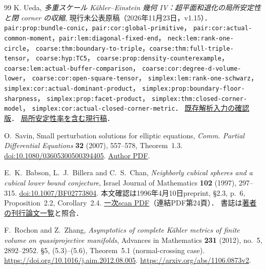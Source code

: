 \begin{thebibliography}{99}
K. Ueda,
\emph{多重スケール Kähler--Einstein 幾何 IV：超平面和退化の局所安定性と閉 corner の収縮},
現行未公表原稿（2026年11月23日，v1.15）．
\texttt{pair:prop:bundle-conic}，\texttt{pair:cor:global-primitive}，
\texttt{pair:cor:actual-common-moment}，\texttt{pair:lem:diagonal-fixed-end}，
\texttt{neck:lem:rank-one-circle}，
\texttt{coarse:thm:boundary-to-triple}，\texttt{coarse:thm:full-triple-tensor}，
\texttt{coarse:hyp:TC5}，
\texttt{coarse:prop:density-counterexample}，
\texttt{coarse:lem:actual-buffer-comparison}，
\texttt{coarse:cor:degree-d-volume-lower}，
\texttt{coarse:cor:open-square-tensor}，
\texttt{simplex:lem:rank-one-schwarz}，
\texttt{simplex:cor:actual-dominant-product}，
\texttt{simplex:prop:boundary-floor-sharpness}，
\texttt{simplex:prop:facet-product}，
\texttt{simplex:thm:closed-corner-model}，
\texttt{simplex:cor:actual-closed-corner-metric}．
\href{https://github.com/uedakazushi/kaehler-einstein-degeneration/blob/9220d4879a7da6c5fab493cf122b1b30829995a5/papers/kaehler-einstein-degeneration.tex}{既存解析入力の確認版}．
\href{https://github.com/uedakazushi/kaehler-einstein-degeneration/blob/1ee0acaf876b1334c964d60c409feb3b18b62373/papers/kaehler-einstein-degeneration.tex}{局所安定性率を含む現行稿}．

O.~Savin,
Small perturbation solutions for elliptic equations,
\emph{Comm. Partial Differential Equations} \textbf{32} (2007), 557--578,
Theorem~1.3.
\href{https://doi.org/10.1080/03605300500394405}{doi:10.1080/03605300500394405}.
\href{https://www.math.columbia.edu/~savin/Small_pert.pdf}{Author PDF}.

E.~K.~Babson, L.~J.~Billera and C.~S.~Chan,
\emph{Neighborly cubical spheres and a cubical lower bound conjecture},
Israel Journal of Mathematics \textbf{102} (1997), 297--315.
\href{https://doi.org/10.1007/BF02773804}{doi:10.1007/BF02773804}.
本文確認は1996年4月10日preprint, \S2.3, p.~6,
Proposition~2.2, Corollary~2.4.
\href{https://www.math.ucdavis.edu/~deloera/MISC/LA-BIBLIO/trunk/Billera/BilleraEhrenborgcdindex.pdf}{一次scan PDF}（連結PDF第24頁）．
書誌は\href{https://pi.math.cornell.edu/~billera/research.html}{著者の刊行論文一覧}と照合．

F.~Rochon and Z.~Zhang,
\emph{Asymptotics of complete K\"ahler metrics of finite volume on quasiprojective manifolds},
Advances in Mathematics \textbf{231} (2012), no.~5, 2892--2952.
\S5, (5.3)--(5.6), Theorem~5.1 (normal-crossing case).
\url{https://doi.org/10.1016/j.aim.2012.08.005}.
\url{https://arxiv.org/abs/1106.0873v2}.


\end{thebibliography}
